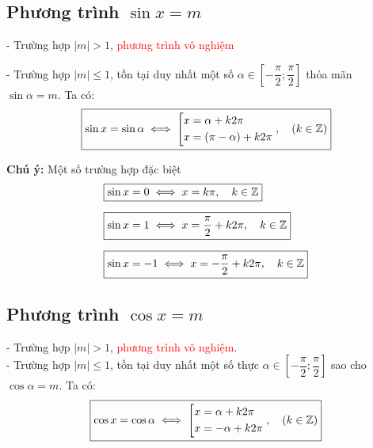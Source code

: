 \subsection{Phương trình $\sin x = m$}
\noindent\hspace*{1cm}- Trường hợp $|m| > 1$, \textcolor{red}{phương trình vô nghiệm}\par\vspace{6pt}
\noindent\hspace*{1cm}- Trường hợp $|m| \leq 1$, tồn tại duy nhất một số $\alpha \in \left[-\dfrac{\pi}{2};\dfrac{\pi}{2}\right]$ thỏa mãn \mbox{$\sin \alpha = m$}. Ta có:
\[
    \begin{aligned}
        \fbox{$
            \sin x = \sin \alpha \iff
            \left[
                \begin{aligned}
                    x &= \alpha + k2\pi\\
                    x &= (\pi -\alpha) + k2\pi
                \end{aligned}
            \right.,
            \quad 
            \left(
                k \in \mathbb{Z}
            \right)      
        $}
    \end{aligned}
\]

\noindent\textbf{Chú ý:} Một số trường hợp đặc biệt
\noindent\hspace*{1cm}
\[
    \begin{aligned}
        &\fbox{$\sin x = 0 \iff x = k \pi, \quad k \in \mathbb{Z}$}\\[6pt]
        &\fbox{$\sin x = 1 \iff x = \dfrac{\pi}{2} + k2\pi, \quad k \in \mathbb{Z}$}\\[6pt]
        &\fbox{$\sin x = -1 \iff x = -\dfrac{\pi}{2} + k2\pi, \quad k \in \mathbb{Z}$}
    \end{aligned}
\]

\subsection{Phương trình $\cos x = m$}
\noindent\hspace*{1cm}- Trường hợp $|m| > 1$, \textcolor{red}{phương trình vô nghiệm}.\\[6pt]
\noindent\hspace*{1cm}- Trường hợp $|m| \leq 1$, tồn tại duy nhất một số thực $\alpha \in \left[-\dfrac{\pi}{2};\dfrac{\pi}{2}\right]$ sao cho $\cos \alpha = m$. Ta có: 
\[
    \begin{aligned}
        \fbox{$
            \cos x = \cos \alpha \iff
            \left[
                \begin{aligned}
                    x &= \alpha + k2\pi\\
                    x &= -\alpha + k2\pi
                \end{aligned}
            \right.,
            \quad 
            \left(
                k \in \mathbb{Z}
            \right)      
        $}
    \end{aligned}
\]

